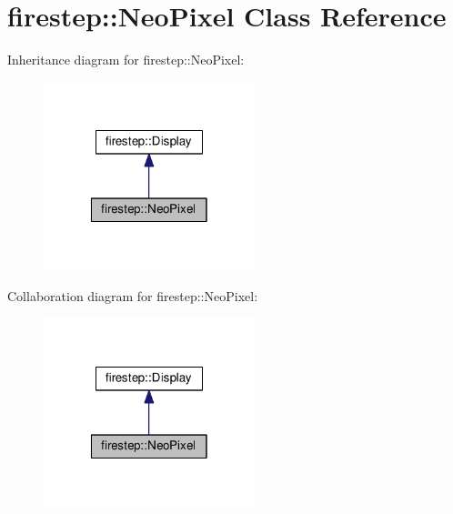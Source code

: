 \hypertarget{classfirestep_1_1_neo_pixel}{\section{firestep\+:\+:Neo\+Pixel Class Reference}
\label{classfirestep_1_1_neo_pixel}
}


Inheritance diagram for firestep\+:\+:Neo\+Pixel\+:\nopagebreak
\begin{figure}[H]
\begin{center}
\leavevmode
\includegraphics[width=174pt]{classfirestep_1_1_neo_pixel__inherit__graph}
\end{center}
\end{figure}


Collaboration diagram for firestep\+:\+:Neo\+Pixel\+:\nopagebreak
\begin{figure}[H]
\begin{center}
\leavevmode
\includegraphics[width=174pt]{classfirestep_1_1_neo_pixel__coll__graph}
\end{center}
\end{figure}
